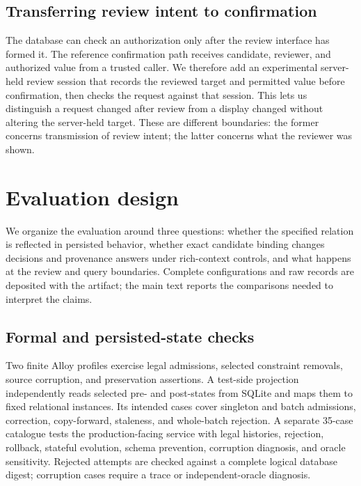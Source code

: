 \documentclass[preprint,12pt,authoryear]{elsarticle}
\begin{document}
\subsection{Transferring review intent to confirmation}

The database can check an authorization only after the review interface has formed it. The reference confirmation path receives candidate, reviewer, and authorized value from a trusted caller. We therefore add an experimental server-held review session that records the reviewed target and permitted value before confirmation, then checks the request against that session. This lets us distinguish a request changed after review from a display changed without altering the server-held target. These are different boundaries: the former concerns transmission of review intent; the latter concerns what the reviewer was shown.

\section{Evaluation design}

We organize the evaluation around three questions: whether the specified relation is reflected in persisted behavior, whether exact candidate binding changes decisions and provenance answers under rich-context controls, and what happens at the review and query boundaries. Complete configurations and raw records are deposited with the artifact; the main text reports the comparisons needed to interpret the claims.

\subsection{Formal and persisted-state checks}

Two finite Alloy profiles exercise legal admissions, selected constraint removals, source corruption, and preservation assertions. A test-side projection independently reads selected pre- and post-states from SQLite and maps them to fixed relational instances. Its intended cases cover singleton and batch admissions, correction, copy-forward, staleness, and whole-batch rejection. A separate 35-case catalogue tests the production-facing service with legal histories, rejection, rollback, stateful evolution, schema prevention, corruption diagnosis, and oracle sensitivity. Rejected attempts are checked against a complete logical database digest; corruption cases require a trace or independent-oracle diagnosis.
\end{document}
